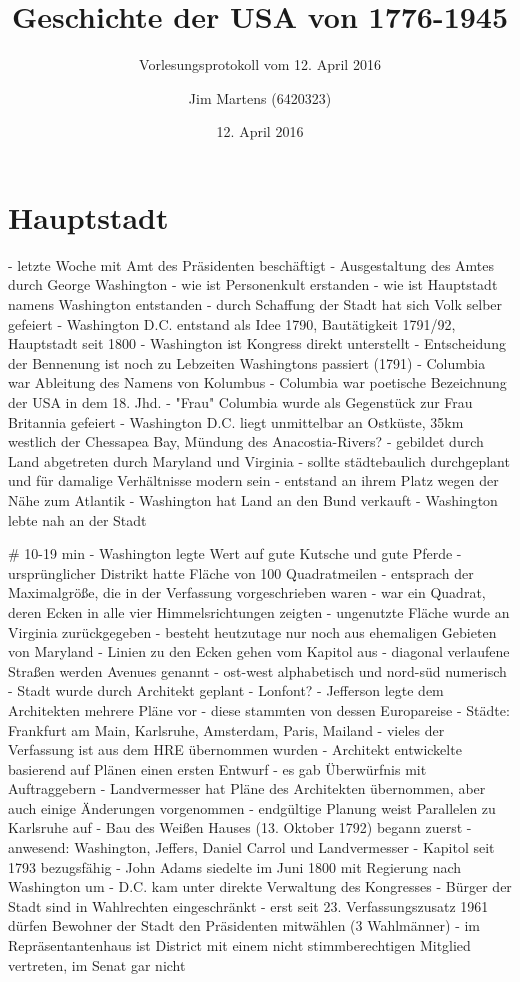 \documentclass[10pt,a4paper,oneside,ngerman,numbers=noenddot]{scrartcl}
\begin{document}
\author{Jim Martens (6420323)}
\title{Geschichte der USA von 1776-1945}
\subtitle{Vorlesungsprotokoll vom 12. April 2016}
\date{12. April 2016}
\maketitle

\section*{Hauptstadt}

- letzte Woche mit Amt des Präsidenten beschäftigt
- Ausgestaltung des Amtes durch George Washington
- wie ist Personenkult erstanden
- wie ist Hauptstadt namens Washington entstanden
- durch Schaffung der Stadt hat sich Volk selber gefeiert
- Washington D.C. entstand als Idee 1790, Bautätigkeit 1791/92,
  Hauptstadt seit 1800
- Washington ist Kongress direkt unterstellt
- Entscheidung der Bennenung ist noch zu Lebzeiten Washingtons passiert (1791)
- Columbia war Ableitung des Namens von Kolumbus
- Columbia war poetische Bezeichnung der USA in dem 18. Jhd.
- "Frau" Columbia wurde als Gegenstück zur Frau Britannia gefeiert
- Washington D.C. liegt unmittelbar an Ostküste, 35km westlich
  der Chessapea Bay, Mündung des Anacostia-Rivers?
- gebildet durch Land abgetreten durch Maryland und Virginia
- sollte städtebaulich durchgeplant und für damalige Verhältnisse
  modern sein
- entstand an ihrem Platz wegen der Nähe zum Atlantik
- Washington hat Land an den Bund verkauft
- Washington lebte nah an der Stadt

# 10-19 min
- Washington legte Wert auf gute Kutsche und gute Pferde
- ursprünglicher Distrikt hatte Fläche von 100 Quadratmeilen
- entsprach der Maximalgröße, die in der Verfassung vorgeschrieben waren
- war ein Quadrat, deren Ecken in alle vier Himmelsrichtungen zeigten
- ungenutzte Fläche wurde an Virginia zurückgegeben
- besteht heutzutage nur noch aus ehemaligen Gebieten von Maryland
- Linien zu den Ecken gehen vom Kapitol aus
- diagonal verlaufene Straßen werden Avenues genannt
- ost-west alphabetisch und nord-süd numerisch
- Stadt wurde durch Architekt geplant
    - Lonfont?
- Jefferson legte dem Architekten mehrere Pläne vor
    - diese stammten von dessen Europareise
    - Städte: Frankfurt am Main, Karlsruhe, Amsterdam, Paris, Mailand
- vieles der Verfassung ist aus dem HRE übernommen wurden
- Architekt entwickelte basierend auf Plänen einen ersten Entwurf
- es gab Überwürfnis mit Auftraggebern
- Landvermesser hat Pläne des Architekten übernommen, aber auch einige
  Änderungen vorgenommen
- endgültige Planung weist Parallelen zu Karlsruhe auf
- Bau des Weißen Hauses (13. Oktober 1792) begann zuerst
    - anwesend: Washington, Jeffers, Daniel Carrol und Landvermesser
- Kapitol seit 1793 bezugsfähig
- John Adams siedelte im Juni 1800 mit Regierung nach Washington um
- D.C. kam unter direkte Verwaltung des Kongresses
- Bürger der Stadt sind in Wahlrechten eingeschränkt
- erst seit 23. Verfassungszusatz 1961 dürfen Bewohner der Stadt
  den Präsidenten mitwählen (3 Wahlmänner)
- im Repräsentantenhaus ist District mit einem nicht stimmberechtigen
  Mitglied vertreten, im Senat gar nicht
\end{document}
